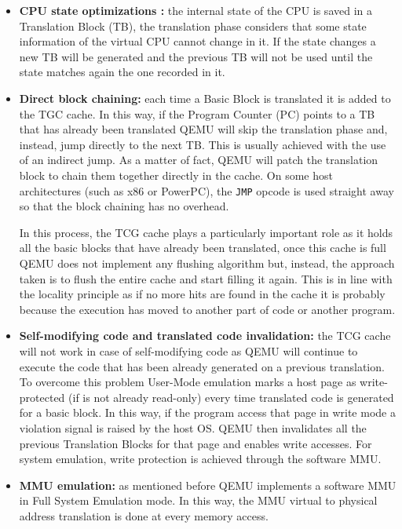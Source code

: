 \begin{itemize}
    \item \textbf{CPU state optimizations :} the internal state of the CPU is saved in a Translation Block (TB), the translation phase considers that some state information of the virtual CPU cannot change in it. If the state changes a new TB will be generated and the previous TB will not be used until the state matches again the one recorded in it.
    
    \item \textbf{Direct block chaining:} each time a Basic Block is translated it is added to the TGC cache. In this way, if the Program Counter (PC) points to a TB that has already been translated QEMU will skip the translation phase and, instead, jump directly to the next TB. This is usually achieved with the use of an indirect jump. As a matter of fact, QEMU will patch the translation block to chain them together directly in the cache. On some host architectures (such as x86 or PowerPC), the \lstinline{JMP} opcode is used straight away so that the block chaining has no overhead.
    
    In this process, the TCG cache plays a particularly important role as it holds all the basic blocks that have already been translated, once this cache is full QEMU does not implement any flushing algorithm but, instead, the approach taken is to flush the entire cache and start filling it again. This is in line with the locality principle as if no more hits are found in the cache it is probably because the execution has moved to another part of code or another program.
    
    \item \textbf{Self-modifying code and translated code invalidation:} the TCG cache will not work in case of self-modifying code as QEMU will continue to execute the code that has been already generated on a previous translation. To overcome this problem User-Mode emulation marks a host page as write-protected (if is not already read-only) every time translated code is generated for a basic block. In this way, if the program access that page in write mode a violation signal is raised by the host OS. QEMU then invalidates all the previous Translation Blocks for that page and enables write accesses. For system emulation, write protection is achieved through the software MMU.
    
    
    \item \textbf{MMU emulation:} as mentioned before QEMU implements a software MMU in Full System Emulation mode. In this way, the MMU virtual to physical address translation is done at every memory access.


\end{itemize}
